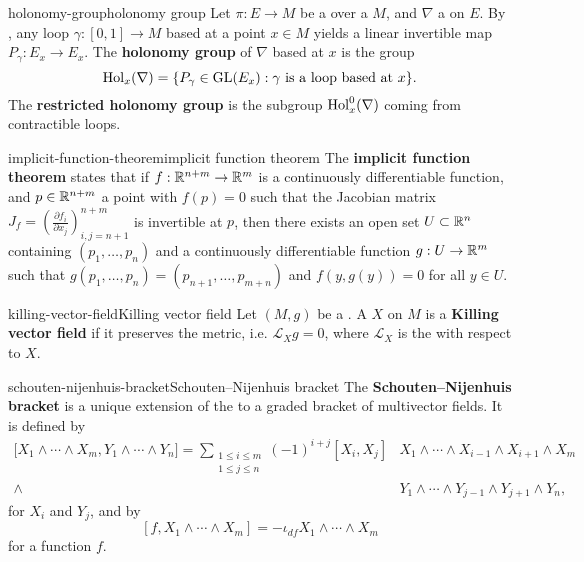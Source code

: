 \begin{topic}{holonomy-group}{holonomy group}
    Let $\pi : E \to M$ be a  over a  $M$, and $\nabla$ a  on $E$. By , any loop $\gamma : [0, 1] \to M$ based at a point $x \in M$ yields a linear invertible map $P_\gamma : E_x \to E_x$. The \textbf{holonomy group} of $\nabla$ based at $x$ is the group
    \[ \textup{Hol}_x(\nabla) = \{ P_\gamma \in \textup{GL}(E_x) : \gamma \text{ is a loop based at } x \} . \]
    The \textbf{restricted holonomy group} is the subgroup $\textup{Hol}_x^0(\nabla)$ coming from contractible loops.
\end{topic}

\begin{topic}{implicit-function-theorem}{implicit function theorem}
    The \textbf{implicit function theorem} states that if $f : \mathbb{R}^{n + m} \to \mathbb{R}^m$ is a continuously differentiable function, and $p \in \mathbb{R}^{n + m}$ a point with $f(p) = 0$ such that the Jacobian matrix $J_f = \left(\frac{\partial f_i}{\partial x_j}\right)_{i,j = n + 1}^{n + m}$ is invertible at $p$, then there exists an open set $U \subset \mathbb{R}^n$ containing $(p_1, \ldots, p_n)$ and a continuously differentiable function $g : U \to \mathbb{R}^m$ such that $g(p_1, \ldots, p_n) = (p_{n + 1}, \ldots, p_{m + n})$ and $f(y, g(y)) = 0$ for all $y \in U$.
\end{topic}

\begin{topic}{killing-vector-field}{Killing vector field}
    Let $(M, g)$ be a . A  $X$ on $M$ is a \textbf{Killing vector field} if it preserves the metric, i.e. $\mathcal{L}_X g = 0$, where $\mathcal{L}_X$ is the  with respect to $X$.
\end{topic}

\begin{topic}{schouten-nijenhuis-bracket}{Schouten--Nijenhuis bracket}
    The \textbf{Schouten--Nijenhuis bracket} is a unique extension of the  to a graded bracket of multivector fields. It is defined by
    \[ \begin{aligned} {[}X_1 \wedge \cdots \wedge X_m, Y_1 \wedge \cdots \wedge Y_n{]} = \sum_{\substack{1 \le i \le m \\ 1 \le j \le n}} (-1)^{i + j} [X_i, X_j] &X_1 \wedge \cdots \wedge X_{i - 1} \wedge X_{i + 1} \wedge X_m \\ \wedge &Y_1 \wedge \cdots \wedge Y_{j - 1} \wedge Y_{j + 1} \wedge Y_n , \end{aligned} \]
    for  $X_i$ and $Y_j$, and by
    \[ [f, X_1 \wedge \cdots \wedge X_m] = -\iota_{df} X_1 \wedge \cdots \wedge X_m \]
    for a function $f$.
\end{topic}

